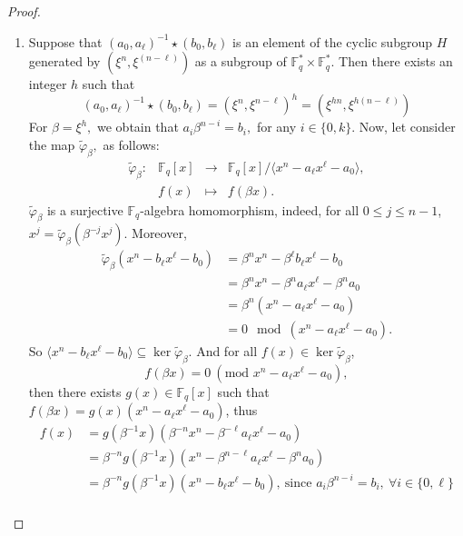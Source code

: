 \documentclass[12pt]{elsarticle}
\newcommand{\Fq}{\mathbb{F}_{q}}
\theoremstyle{break}
{\theorembodyfont{\upshape}
    \newtheorem{theorem}{Theorem}[section] %
    \newtheorem{lemma}[theorem]{Lemma} %
    \newtheorem{proposition}[theorem]{Proposition}
    \newtheorem{corollary}[theorem]{Corollary}
    \newtheorem{definition}[theorem]{Definition}
    \newtheorem{example}[theorem]{Example}
    \newtheorem{remark}[theorem]{Remark}
    \newtheorem{conjecture}[theorem]{Conjecture}
    \newtheorem*{proof}{{Proof}}
	\newtheorem*{notation}{Notation}
	\newtheorem*{main}{Cain Theorem}
	\newtheorem*{problem}{Problem}
}
\begin{document}
\begin{proof}
\begin{enumerate}
    \item[(6) $\Rightarrow$ (1)]  
     Suppose that $ (a_0,a_{\ell})^{-1}\star(b_0, b_{\ell}) $ is an element of the cyclic subgroup  $H$ generated by $  (\xi^{n}, \xi^{(n-\ell)})  $  as a subgroup of $ \Fq^{*}\times \Fq^{*}$. Then there exists an integer $ h$ such that 
     $$ (a_0,a_{\ell})^{-1}\star(b_0, b_{\ell})=(\xi^n,\xi^{n-\ell})^h=( \xi^{hn}, \xi^{h(n-\ell)}) $$
    For $ \beta= \xi^{h}, $ we obtain  that $  a_i \beta^{n-i}= b_i, $ for any $ i\in \{ 0,k\}.$
Now, let consider the map $ \tilde{\varphi}_{\beta}, $ as follows: 
  \begin{equation}
        \begin{array}{cccc}
        \tilde{\varphi}_{\beta} : & \mathbb{F}_q[x]  & \longrightarrow & \mathbb{F}_q[x] /\langle x^n - a_{\ell} x^{\ell} - a_0 \rangle, \\ 
        & f(x) & \longmapsto & f(\beta x).
        \end{array}
    \end{equation} 
	$ \tilde{\varphi}_{\beta}$ is a surjective $\Fq$-algebra homomorphism, indeed, for  all $0\leq j \leq n-1$, $x^{j}  = \tilde{\varphi}_{\beta}(\beta^{-j}x^{j})$. 
	Moreover, 
 $$ 
    \begin{array}{rl}
    \tilde{\varphi}_{\beta} (x^n - b_{\ell} x^{\ell} - b_0) & = \beta^n x^n - \beta^{\ell} b_{\ell} x^{\ell} - b_0 \\
    & = \beta^n x^n - \beta^n a_{\ell} x^{\ell} - \beta^n a_0 \\
    & = \beta^n(x^n - a_{\ell} x^{\ell} - a_0) \\
    & = 0 \mod (x^n - a_{\ell} x^{\ell} - a_0).
    \end{array}
    $$ 
	So $\langle x^n - b_{\ell} x^{\ell} - b_0\rangle \subseteq \ker\tilde{\varphi}_{\beta}$. And for all $f(x)\in \ker\tilde{\varphi}_{\beta}$,
    $$f(\beta x)= 0~ (\text{mod } x^{n}- a_{\ell} x^{\ell} - a_0),$$ then there exists $g(x)\in \Fq[x]$ such that $f(\beta x)=g(x)(x^{n}- a_{\ell} x^{\ell} - a_0)$, thus 
 $$
  \begin{array}{rl}
 f(x)&=g(\beta^{-1}x)(\beta^{-n}x^{n}- \beta^{-\ell} a_{\ell} x^{\ell} - a_0) \\
 & =\beta^{-n}g(\beta^{-1}x)(x^{n}- \beta^{n-\ell}a_{\ell} x^{\ell} - \beta^{n} a_0)\\
 &= \beta^{-n}g(\beta^{-1}x)( x^n-  b_{\ell} x^{\ell} - b_0), \ \text{since  $a_i \beta^{n-i} =b_i, \ \forall i \in \{0, \ell\}$} \\ 
 \end{array}$$

\end{enumerate}
\end{proof}
\end{document}
